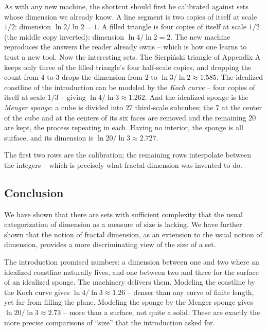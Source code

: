 As with any new machine, the shortcut should first be calibrated
against sets whose dimension we already know. A line segment is two
copies of itself at scale $1/2$: dimension $\ln 2 / \ln 2 = 1$. A
filled triangle is four copies of itself at scale $1/2$ (the middle
copy inverted): dimension $\ln 4 / \ln 2 = 2$. The new machine
reproduces the answers the reader already owns -- which is how one
learns to trust a new tool. Now the interesting sets. The
Sierpi\'nski triangle of Appendix A keeps only three of the filled
triangle's four half-scale copies, and dropping the count from $4$ to
$3$ drops the dimension from $2$ to $\ln 3 / \ln 2 \approx 1.585$.
The idealized coastline of the introduction can be modeled by the
{\it Koch curve\/} -- four copies of itself at scale $1/3$ -- giving
$\ln 4 / \ln 3 \approx 1.262$. And the idealized sponge is the
{\it Menger sponge\/}: a cube is divided into $27$ third-scale
subcubes; the $7$ at the center of the cube and at the centers of its
six faces are removed and the remaining $20$ are kept, the process
repeating in each. Having no interior, the sponge is all surface, and
its dimension is $\ln 20 / \ln 3 \approx 2.727$.

\bigskip
\centerline{\vbox{}}
\bigskip

The first two rows are the calibration; the remaining rows interpolate
between the integers -- which is precisely what fractal dimension was
invented to do.

\subsection{Conclusion}
We have shown that there are sets with sufficient complexity that the
usual categorization of dimension as a measure of size is lacking. 
We have further shown
that the notion of fractal dimension, as an extension to the usual
notion of dimension, provides a more discriminating view of the size
of a set.

The introduction promised numbers: a dimension between one and two
where an idealized coastline naturally lives, and one between two and
three for the surface of an idealized sponge. The machinery delivers
them. Modeling the coastline by the Koch curve gives
$\ln 4 / \ln 3 \approx 1.26$ -- denser than any curve of finite
length, yet far from filling the plane. Modeling the sponge by the
Menger sponge gives $\ln 20 / \ln 3 \approx 2.73$ -- more than a
surface, not quite a solid. These are exactly the more precise
comparisons of ``size'' that the introduction asked for.

